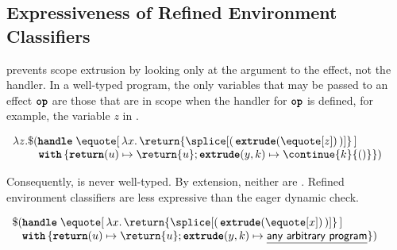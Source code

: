 
\subsection{Expressiveness of Refined Environment Classifiers}\label{subsection:rec-formal-expressiveness}
\recLang{} prevents scope extrusion by looking only at the argument to the effect, not the handler. In a well-typed \recLang{} program, the only variables that may be passed to an effect $\textbf{\texttt{op}}$ are those that are in scope when the handler for $\textbf{\texttt{op}}$ is defined, for example, the variable $z$ in .

\begin{code}
\begin{rec}
$\begin{array}{l}
  \lambda z. \$(\textbf{\texttt{handle}} \; \equote[\, {\lambda x. \, \return{\splice[( \, {{\textbf{\texttt{extrude}}(\equote[z])}} \, )]}} \,] \\
  \quad \quad \,\, \textbf{\texttt{with}} \, \{ \textbf{\texttt{return}}(u) \mapsto {\return{u}}; \textbf{\texttt{extrude}}(y, k) \mapsto {\continue{k}{()}}\})
\end{array}$
\end{rec}
%
\label{listing:refined-environment-classifiers-safe}
\end{code}

Consequently,  is never well-typed. By extension, neither are . Refined environment classifiers are less expressive than the eager dynamic check. 


\begin{code}
\begin{rec}
$\begin{array}{l}
  \$ (\textbf{\texttt{handle}} \; \equote[\, {\lambda x. \, \return{\splice[(\, {{\textbf{\texttt{extrude}}(\equote[x])}} \, )]}} \, ] \\
  \;\;\,\, \textbf{\texttt{with}} \, \{ \textbf{\texttt{return}}(u) \mapsto {\return{u}}; \textbf{\texttt{extrude}}(y, k) \mapsto {\underline{\textsf{any arbitrary program}}}\})
\end{array}$
\end{rec}
%
\label{listing:refined-environment-classifiers-expressiveness}
\end{code}

